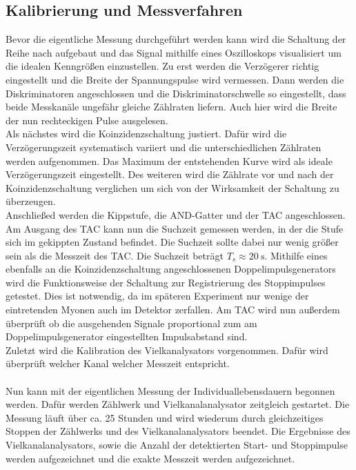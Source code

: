 \subsection{Kalibrierung und Messverfahren}
\label{sub:kalimes}
Bevor die eigentliche Messung durchgeführt werden kann wird die Schaltung der Reihe nach aufgebaut und das Signal mithilfe eines Oszilloskops visualisiert um die idealen Kenngrößen einzustellen.
Zu erst werden die Verzögerer richtig eingestellt und die Breite der Spannungspulse wird vermessen.
Dann werden die Diskriminatoren angeschlossen und die Diskriminatorschwelle so eingestellt, dass beide Messkanäle ungefähr gleiche Zählraten liefern.
Auch hier wird die Breite der nun rechteckigen Pulse ausgelesen.\\
Als nächstes wird die Koinzidenzschaltung justiert. Dafür wird die Verzögerungszeit systematisch variiert und die unterschiedlichen Zählraten werden aufgenommen.
Das Maximum der entstehenden Kurve wird als ideale Verzögerungszeit eingestellt. Des weiteren wird die Zählrate vor und nach der Koinzidenzschaltung verglichen um sich von der Wirksamkeit der Schaltung
zu überzeugen.\\
Anschließed werden die Kippstufe, die AND-Gatter und der TAC angeschlossen. Am Ausgang des TAC kann nun die Suchzeit gemessen werden, in der die Stufe sich im gekippten Zustand befindet.
Die Suchzeit sollte dabei nur wenig größer sein als die Messzeit des TAC. Die Suchzeit beträgt $T_s \approx \SI{20}{\second}$. Mithilfe eines ebenfalls an die Koinzidenzschaltung angeschlossenen Doppelimpulsgenerators wird die Funktionsweise der Schaltung zur Registrierung des Stoppimpulses getestet. Dies ist notwendig, da im späteren Experiment nur wenige der eintretenden Myonen auch im Detektor zerfallen. Am TAC wird nun außerdem überprüft ob die ausgehenden Signale proportional zum am Doppelimpulsgenerator eingestellten Impulsabstand sind.\\
Zuletzt wird die Kalibration des Vielkanalysators vorgenommen. Dafür wird überprüft welcher Kanal welcher Messzeit entspricht.\\
\\
Nun kann mit der eigentlichen Messung der Individuallebensdauern begonnen werden. Dafür werden Zählwerk und Vielkanalanalysator zeitgleich gestartet. Die Messung läuft über ca. 25 Stunden und wird wiederum durch gleichzeitiges Stoppen der Zählwerks und des Vielkanalanalysators beendet. Die Ergebnisse des Vielkanalanalysators, sowie die Anzahl der detektierten Start- und Stoppimpulse werden aufgezeichnet und die exakte Messzeit werden aufgezeichnet.\\
